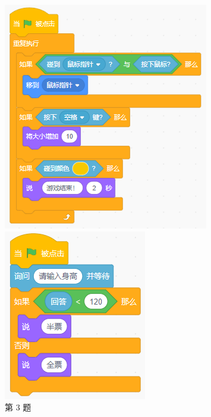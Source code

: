 \documentclass[10pt, a4paper]{article}
\begin{document}
\begin{enumerate}
\begin{figure}[htbp]
\begin{minipage}[t]{.26\textwidth}
                \includegraphics[width=\textwidth]{3.png}
                \caption*{第 3 题}
            \end{minipage}
            \begin{minipage}[t]{.24\textwidth}
                \centering
                \includegraphics[width=\textwidth]{6.png}

\end{minipage}
\end{figure}
\end{enumerate}
\end{document}
